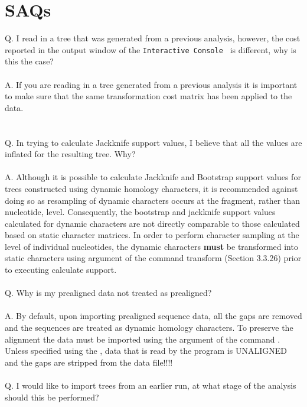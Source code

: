 \section{SAQs}
Q. I read in a tree that was generated from a previous analysis, however, the cost reported in the output window
of the \texttt {Interactive Console } is different, why is this the case?\\
\\
A. If you are reading in a tree generated from a previous analysis it is important to make sure that the same 
transformation cost matrix has been applied to the data.\\
\\
\\
Q. In trying to calculate Jackknife support values, I believe that all the values are inflated for the resulting tree.
Why?\\
\\
A. Although it is possible to calculate Jackknife and Bootstrap support values for trees constructed using dynamic 
homology characters, it is recommended against doing so as resampling of dynamic characters occurs at the fragment, 
rather than nucleotide, level. Consequently, the bootstrap and jackknife support values calculated for dynamic 
characters are not directly comparable to those calculated based on static character matrices. In order to perform 
character sampling at the level of individual nucleotides, the dynamic characters {\bf must} be transformed into 
static characters using  argument of the command transform (Section 3.3.26) prior 
to executing calculate support.\\
\\
Q. Why is my prealigned data not treated as prealigned?\\
\\
A.  By default, upon importing prealigned sequence data, all the gaps are removed and the sequences are 
treated as dynamic homology characters. To preserve the alignment the data must be imported using the
 argument of the command .  Unless specified using the 
, data that is read by the program is UNALIGNED and the gaps are stripped 
from the data file!!!!\\
\\
Q. I would like to import trees from an earlier run, at what stage of the analysis should this be performed?\\
\\
